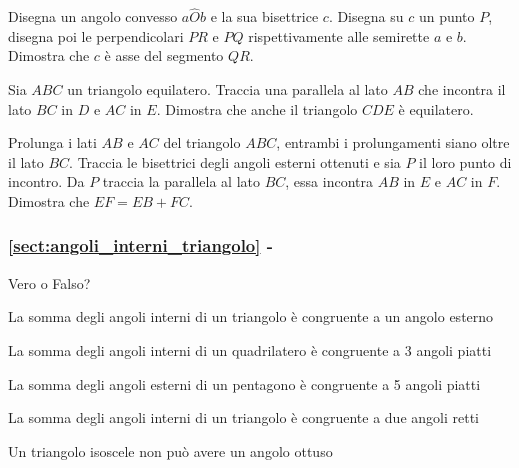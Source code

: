 \begin{multicols}{2}
\begin{esercizio}
\label{ese:3.44}
Disegna un angolo convesso $a\widehat{O}b$ e la sua bisettrice $c$. 
Disegna su $c$ un punto $P$, disegna poi le perpendicolari $PR$ e 
$PQ$ rispettivamente alle semirette $a$ e $b$. Dimostra che $c$ è asse 
del segmento $QR$.
\end{esercizio}

\begin{esercizio}
\label{ese:3.45}
Sia $ABC$ un triangolo equilatero. Traccia una parallela al lato $AB$ 
che incontra il lato $BC$ in $D$ e $AC$ in $E$. Dimostra che anche il 
triangolo $CDE$ è equilatero.
\end{esercizio}

\begin{esercizio}
\label{ese:3.46}
Prolunga i lati $AB$ e $AC$ del triangolo $ABC$, entrambi i 
prolungamenti siano oltre il lato $BC$. Traccia le bisettrici degli 
angoli esterni ottenuti e sia $P$ il loro punto di incontro. Da $P$ 
traccia la parallela al lato $BC$, essa incontra $AB$ in $E$ e $AC$ 
in $F$. Dimostra che $EF=EB+FC$.
\end{esercizio}
\end{multicols}

\begingroup
\hypersetup{linkcolor=black}
\subsubsection*{\ref{sect:angoli_interni_triangolo} - 
}
\endgroup

\begin{esercizio}
\label{ese:3.47}
Vero o Falso?
\begin{enumeratea}
\item La somma degli angoli interni di un triangolo è congruente a un 
angolo esterno\tab\tab\hfill\boxV\quad\boxF
\item La somma degli angoli interni di un quadrilatero è congruente a 
3 angoli piatti\tab\tab\hfill\boxV\quad\boxF
\item La somma degli angoli esterni di un pentagono è congruente a 5 
angoli piatti\hfill\boxV\quad\boxF
\item La somma degli angoli interni di un triangolo è congruente a 
due angoli retti\hfill\boxV\quad\boxF
\item Un triangolo isoscele non può avere un angolo 
ottuso\hfill\boxV\quad\boxF
\end{enumeratea}
\end{esercizio}

